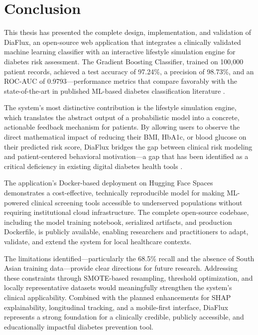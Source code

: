 \documentclass[12pt,a4paper]{report}
\begin{document}
\section{Conclusion}
This thesis has presented the complete design, implementation, and validation of DiaFlux, an open-source web application that integrates a clinically validated machine learning classifier with an interactive lifestyle simulation engine for diabetes risk assessment. The Gradient Boosting Classifier, trained on 100,000 patient records, achieved a test accuracy of 97.24\%, a precision of 98.73\%, and an ROC-AUC of 0.9793---performance metrics that compare favorably with the state-of-the-art in published ML-based diabetes classification literature \cite{sisodia_diabetes, kaviani_classifiers, friedman_gb}.

The system's most distinctive contribution is the lifestyle simulation engine, which translates the abstract output of a probabilistic model into a concrete, actionable feedback mechanism for patients. By allowing users to observe the direct mathematical impact of reducing their BMI, HbA1c, or blood glucose on their predicted risk score, DiaFlux bridges the gap between clinical risk modeling and patient-centered behavioral motivation---a gap that has been identified as a critical deficiency in existing digital diabetes health tools \cite{who_dhi_report, jmir_mhealth}.

The application's Docker-based deployment on Hugging Face Spaces demonstrates a cost-effective, technically reproducible model for making ML-powered clinical screening tools accessible to underserved populations without requiring institutional cloud infrastructure. The complete open-source codebase, including the model training notebook, serialized artifacts, and production Dockerfile, is publicly available, enabling researchers and practitioners to adapt, validate, and extend the system for local healthcare contexts.

The limitations identified---particularly the 68.5\% recall and the absence of South Asian training data---provide clear directions for future research. Addressing these constraints through SMOTE-based resampling, threshold optimization, and locally representative datasets would meaningfully strengthen the system's clinical applicability. Combined with the planned enhancements for SHAP explainability, longitudinal tracking, and a mobile-first interface, DiaFlux represents a strong foundation for a clinically credible, publicly accessible, and educationally impactful diabetes prevention tool.
\end{document}
